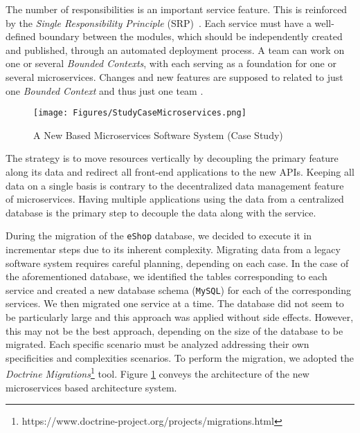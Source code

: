 \documentclass[a4paper,twoside]{article}
\begin{document}
The number of responsibilities is an important service feature. This is reinforced by the \textit{Single Responsibility Principle} (SRP)~\cite{martin2002single}. Each service must have a well-defined boundary between the modules, which should be independently created and published, through an automated deployment process. 
A team can work on one or several \textit{Bounded Contexts}, with each serving as a foundation for one or several microservices. Changes and new features are supposed to related to just one \textit{Bounded Context} and thus just one team \cite{wolff2016microservices}.


\begin{figure}
\centering
\texttt{[image: Figures/StudyCaseMicroservices.png]}
\caption{A New Based Microservices Software System (Case Study) \cite{henriqueITNG2019expReport}}
\label{fig:StudyCaseMicroservices}
\end{figure}

The strategy is to move resources vertically by decoupling the primary feature along its data and redirect all front-end applications to the new APIs. Keeping all data on a single basis is contrary to the decentralized data management feature of microservices. Having multiple applications using the data from a centralized database is the primary step to decouple the data along with the service.

During the migration of the \texttt{eShop} database, we decided to execute it in incrementar steps due to its inherent complexity. Migrating data from a legacy software system requires careful planning, depending on each case. In the case of the aforementioned database, we identified the tables corresponding to each service and created a new database schema (\texttt{MySQL}) for each of the corresponding services. We then migrated one service at a time. The database did not seem to be particularly large and this approach was applied without side effects. However, this may not be the best approach, depending on the size of the database to be migrated. Each specific scenario must be analyzed addressing their own specificities and complexities scenarios. To perform the migration, we adopted the \textit{Doctrine Migrations}\footnote{https://www.doctrine-project.org/projects/migrations.html} tool. Figure \ref{fig:StudyCaseMicroservices} conveys the architecture of the new microservices based architecture system.
\end{document}
